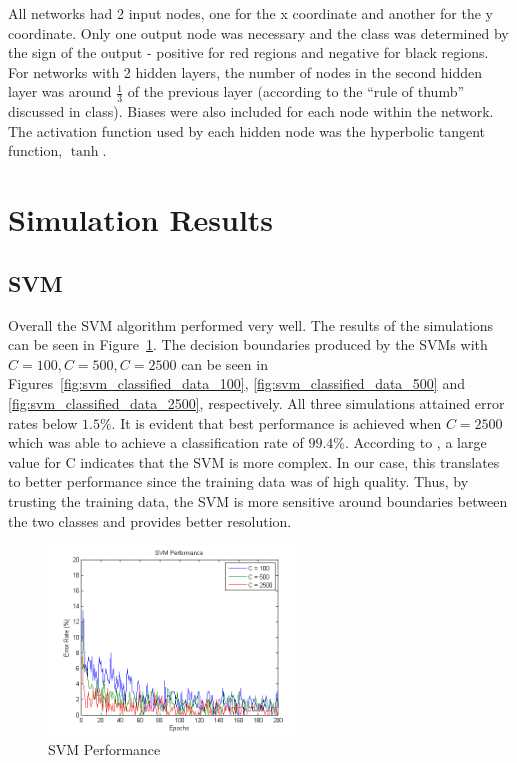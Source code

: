 \documentclass[11pt,letterpaper,titlepage]{article}
\numberwithin{equation}{section}
\numberwithin{figure}{section}
\numberwithin{table}{section}
\begin{document}
All networks had 2 input nodes, one for the x coordinate and another for the y coordinate. Only one output node was necessary and the class was determined by the sign of the output - positive for red regions and negative for black regions. For networks with 2 hidden layers, the number of nodes in the second hidden layer was around \(\frac{1}{3}\) of the previous layer (according to the ``rule of thumb'' discussed in class). Biases were also included for each node within the network. The activation function used by each hidden node was the hyperbolic tangent function, \(\tanh\).

\section{Simulation Results}
\label{sec:simulation-results}

\subsection{SVM}
\label{sec:svm-2}

Overall the SVM algorithm performed very well. The results of the simulations can be seen in Figure~\ref{fig:svm-performance}. The decision boundaries produced by the SVMs with \(C=100, C=500, C=2500\) can be seen in Figures~\ref{fig:svm_classified_data_100}, \ref{fig:svm_classified_data_500} and \ref{fig:svm_classified_data_2500}, respectively. All three simulations attained error rates below \(1.5\%\). It is evident that best performance is achieved when \(C=2500\) which was able to achieve a classification rate of \(99.4\%\). According to \cite{Haykin2008}, a large value for C indicates that the SVM is more complex. In our case, this translates to better performance since the training data was of high quality. Thus, by trusting the training data, the SVM is more sensitive around boundaries between the two classes and provides better resolution.

\begin{figure}[!ht]
  \centering
  \includegraphics[width=0.6\textwidth]{img/svm_performance}
  \caption{SVM Performance}
  \label{fig:svm-performance}
\end{figure}
\end{document}
